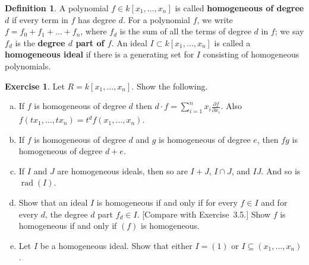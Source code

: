 \documentclass{amsart}
\theoremstyle{plain}
\theoremstyle{definition}
\newtheorem{definition}{Definition}
\newtheorem{exercise}[theorem]{Exercise}
\theoremstyle{definition}
\newcommand{\defining}[1]{\textbf{#1}}
\DeclareMathOperator{\radname}{rad}
\newcommand{\rad}[1]{\radname(#1)}
\newcommand{\Z}{\mathbb{Z}}
\newcommand{\R}{\mathbb{R}}
\begin{document}
\begin{definition}
A polynomial $f \in k[x_1,\dots,x_n]$ is called \defining{homogeneous of degree $d$}
if every term in $f$ has degree $d$.
For a polynomial $f$, we write $f = f_0 + f_1 + \dots + f_n$, where $f_d$ is the sum of all the
terms of degree $d$ in $f$; we say $f_d$ is the \defining{degree $d$ part of $f$}.
An ideal $I \subset k[x_1,\dots,x_n]$ is called a \defining{homogeneous ideal}
if there is a generating set for $I$ consisting of homogeneous polynomials.
\end{definition}

\begin{exercise}
Let $R = k[x_1,\dots,x_n]$.
Show the following.
\begin{enumerate}[a.]
\item If $f$ is homogeneous of degree $d$ then
 $d \cdot f = \sum_{i=1}^n x_i \frac{\partial f}{\partial x_i}$.
 Also $f(tx_1,\dots,tx_n) = t^d f(x_1,\dots,x_n)$.
\item If $f$ is homogeneous of degree $d$ and $g$ is homogeneous of degree $e$,
then $fg$ is homogeneous of degree $d+e$.
\item If $I$ and $J$ are homogeneous ideals, then so are $I+J$, $I \cap J$, and $IJ$.
And so is $\rad{I}$.
\item Show that an ideal $I$ is homogeneous if and only if for every $f \in I$ and for every $d$,
the degree $d$ part $f_d \in I$. [Compare with Exercise~3.5.]
Show $f$ is homogeneous if and only if $(f)$ is homogeneous.
\item Let $I$ be a homogeneous ideal. Show that either $I = (1)$ or $I \subseteq (x_1,\dots,x_n)$.
\end{enumerate}
\end{exercise}




\end{document}

